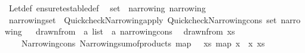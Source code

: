 \begin{isabellebody}
%
\endisadelimproof
%
\isatagproof
{}\isamarkupfalse%
\ Let{\isacharunderscore}{\kern0pt}def\ ensure{\isacharunderscore}{\kern0pt}testable{\isacharunderscore}{\kern0pt}def\ \isacommand{{\isachardot}{\kern0pt}{\isachardot}{\kern0pt}}\isamarkupfalse%
%
\endisatagproof
{\isafoldproof}%
%
\isadelimproof
%
\endisadelimproof
%
\isadelimdocument
%
\endisadelimdocument
%
\isatagdocument
%
\isamarkuptrue%
%
\endisatagdocument
{\isafolddocument}%
%
\isadelimdocument
%
\endisadelimdocument
{}\isamarkupfalse%
\ set\ {\isacharcolon}{\kern0pt}{\isacharcolon}{\kern0pt}\ {\isacharparenleft}{\kern0pt}narrowing{\isacharparenright}{\kern0pt}\ narrowing\isanewline
{}\isanewline
\isanewline
{}\isamarkupfalse%
\ {\isachardoublequoteopen}narrowing{\isacharunderscore}{\kern0pt}set\ {\isacharequal}{\kern0pt}\ Quickcheck{\isacharunderscore}{\kern0pt}Narrowing{\isachardot}{\kern0pt}apply\ {\isacharparenleft}{\kern0pt}Quickcheck{\isacharunderscore}{\kern0pt}Narrowing{\isachardot}{\kern0pt}cons\ set{\isacharparenright}{\kern0pt}\ narrowing{\isachardoublequoteclose}\isanewline
\isanewline
{}\isamarkupfalse%
%
\isadelimproof
\ %
\endisadelimproof
%
\isatagproof
\isacommand{{\isachardot}{\kern0pt}{\isachardot}{\kern0pt}}\isamarkupfalse%
%
\endisatagproof
{\isafoldproof}%
%
\isadelimproof
%
\endisadelimproof
\isanewline
\isanewline
{}\isamarkupfalse%
%
\isadelimdocument
%
\endisadelimdocument
%
\isatagdocument
%
\isamarkuptrue%
%
\endisatagdocument
{\isafolddocument}%
%
\isadelimdocument
%
\endisadelimdocument
{}\isamarkupfalse%
\ drawn{\isacharunderscore}{\kern0pt}from\ {\isacharcolon}{\kern0pt}{\isacharcolon}{\kern0pt}\ {\isachardoublequoteopen}{\isacharprime}{\kern0pt}a\ list\ {\isasymRightarrow}\ {\isacharprime}{\kern0pt}a\ narrowing{\isacharunderscore}{\kern0pt}cons{\isachardoublequoteclose}\isanewline
{}\isanewline
\ \ {\isachardoublequoteopen}drawn{\isacharunderscore}{\kern0pt}from\ xs\ {\isacharequal}{\kern0pt}\isanewline
\ \ \ \ Narrowing{\isacharunderscore}{\kern0pt}cons\ {\isacharparenleft}{\kern0pt}Narrowing{\isacharunderscore}{\kern0pt}sum{\isacharunderscore}{\kern0pt}of{\isacharunderscore}{\kern0pt}products\ {\isacharparenleft}{\kern0pt}map\ {\isacharparenleft}{\kern0pt}{\isasymlambda}{\isacharunderscore}{\kern0pt}{\isachardot}{\kern0pt}\ {\isacharbrackleft}{\kern0pt}{\isacharbrackright}{\kern0pt}{\isacharparenright}{\kern0pt}\ xs{\isacharparenright}{\kern0pt}{\isacharparenright}{\kern0pt}\ {\isacharparenleft}{\kern0pt}map\ {\isacharparenleft}{\kern0pt}{\isasymlambda}x\ {\isacharunderscore}{\kern0pt}{\isachardot}{\kern0pt}\ x{\isacharparenright}{\kern0pt}\ xs{\isacharparenright}{\kern0pt}{\isachardoublequoteclose}\isanewline

\end{isabellebody}

